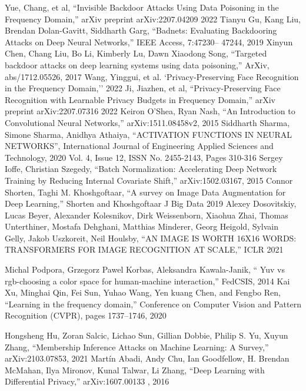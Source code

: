 \documentclass[conference]{IEEEtran}
\begin{document}
\begin{thebibliography}{00}


 Yue, Chang, et al, ``Invisible Backdoor Attacks Using Data Poisoning in the Frequency Domain,''  arXiv preprint arXiv:2207.04209 2022
 Tianyu Gu, Kang Liu, Brendan Dolan-Gavitt, Siddharth Garg, ``Badnets: Evaluating Backdooring Attacks on Deep Neural Networks,'' IEEE Access, 7:47230– 47244, 2019
 Xinyun Chen, Chang Liu, Bo Li, Kimberly Lu, Dawn Xiaodong Song, ``Targeted backdoor attacks on deep learning systems using data poisoning,'' ArXiv, abs/1712.05526, 2017
  Wang, Yinggui, et al.  `Privacy-Preserving Face Recognition in the Frequency Domain,''  2022
 Ji, Jiazhen, et al, ``Privacy-Preserving Face Recognition with Learnable Privacy Budgets in Frequency Domain,''  	arXiv preprint arXiv:2207.07316 2022
 Keiron O’Shea, Ryan Nash, ``An Introduction to Convolutional Neural Networks,'' arXiv:1511.08458v2, 2015
 Siddharth Sharma, Simone Sharma, Anidhya Athaiya, ``ACTIVATION FUNCTIONS IN NEURAL NETWORKS'', International Journal of Engineering Applied Sciences and Technology, 2020
Vol. 4, Issue 12, ISSN No. 2455-2143, Pages 310-316 
 Sergey Ioffe, Christian Szegedy, ``Batch Normalization: Accelerating Deep Network Training by Reducing Internal Covariate Shift,''  arXiv:1502.03167, 2015
 Connor Shorten, Taghi M. Khoshgoftaar, ``A survey on Image Data Augmentation for Deep Learning,'' Shorten and Khoshgoftaar J Big Data 2019
 Alexey Dosovitskiy, Lucas Beyer, Alexander Kolesnikov, Dirk Weissenborn, Xiaohua Zhai, Thomas Unterthiner, Mostafa Dehghani, Matthias Minderer, Georg Heigold, Sylvain Gelly, Jakob Uszkoreit, Neil Houlsby, ``AN IMAGE IS WORTH 16X16 WORDS: TRANSFORMERS FOR IMAGE RECOGNITION AT SCALE,'' ICLR 2021

 Michal Podpora, Grzegorz Pawel Korbas, Aleksandra Kawala-Janik, `` Yuv vs rgb-choosing a color space for human-machine interaction,''  FedCSIS, 2014
 Kai Xu, Minghai Qin, Fei Sun, Yuhao Wang, Yen kuang Chen, and Fengbo Ren, ``Learning in the frequency domain,''  Conference on Computer Vision and Pattern Recognition (CVPR), pages 1737–1746, 2020

 Hongsheng Hu, Zoran Salcic, Lichao Sun, Gillian Dobbie, Philip S. Yu, Xuyun Zhang, ``Membership Inference Attacks on Machine Learning: A Survey,''  	arXiv:2103.07853, 2021
 Martín Abadi, Andy Chu, Ian Goodfellow, H. Brendan McMahan, Ilya Mironov, Kunal Talwar, Li Zhang, ``Deep Learning with Differential Privacy,''  	arXiv:1607.00133 , 2016
\end{thebibliography}
\vspace{12pt}
\end{document}
